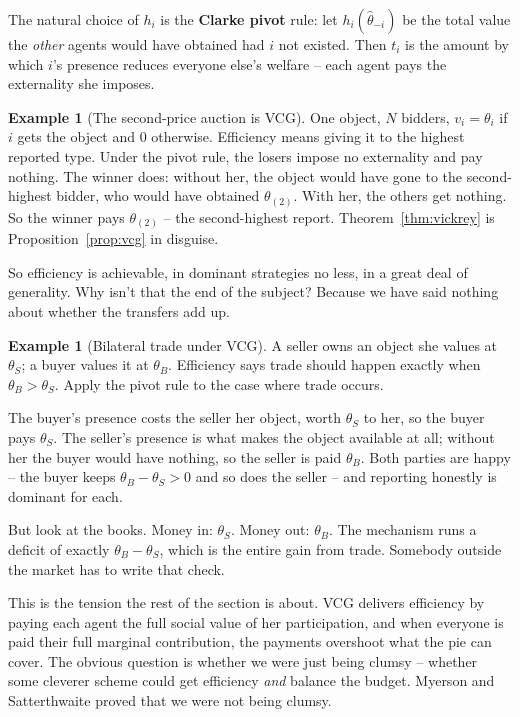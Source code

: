 \documentclass[12pt]{article}
\theoremstyle{definition}
\newtheorem{example}[theorem]{Example}
\theoremstyle{remark}
\theoremstyle{plain}                          %
\begin{document}
\noindent The natural choice of $h_i$ is the \textbf{Clarke pivot} rule: let $h_i(\hat\theta_{-i})$ be the total value the \emph{other} agents would have obtained had $i$ not existed. Then $t_i$ is the amount by which $i$'s presence reduces everyone else's welfare -- each agent pays the externality she imposes.
 
\begin{example}[The second-price auction is VCG]
One object, $N$ bidders, $v_i = \theta_i$ if $i$ gets the object and $0$ otherwise. Efficiency means giving it to the highest reported type. Under the pivot rule, the losers impose no externality and pay nothing. The winner does: without her, the object would have gone to the second-highest bidder, who would have obtained $\theta_{(2)}$. With her, the others get nothing. So the winner pays $\theta_{(2)}$ -- the second-highest report. Theorem~\ref{thm:vickrey} is Proposition~\ref{prop:vcg} in disguise.
\end{example}
 
So efficiency is achievable, in dominant strategies no less, in a great deal of generality. Why isn't that the end of the subject? Because we have said nothing about whether the transfers add up.
 
\begin{example}[Bilateral trade under VCG]\label{ex:vcg-trade}
A seller owns an object she values at $\theta_S$; a buyer values it at $\theta_B$. Efficiency says trade should happen exactly when $\theta_B > \theta_S$. Apply the pivot rule to the case where trade occurs.
 
The buyer's presence costs the seller her object, worth $\theta_S$ to her, so the buyer pays $\theta_S$. The seller's presence is what makes the object available at all; without her the buyer would have nothing, so the seller is paid $\theta_B$. Both parties are happy -- the buyer keeps $\theta_B - \theta_S > 0$ and so does the seller -- and reporting honestly is dominant for each.
 
But look at the books. Money in: $\theta_S$. Money out: $\theta_B$. The mechanism runs a deficit of exactly $\theta_B - \theta_S$, which is the entire gain from trade. Somebody outside the market has to write that check.
\end{example}
 
This is the tension the rest of the section is about. VCG delivers efficiency by paying each agent the full social value of her participation, and when everyone is paid their full marginal contribution, the payments overshoot what the pie can cover. The obvious question is whether we were just being clumsy -- whether some cleverer scheme could get efficiency \emph{and} balance the budget. Myerson and Satterthwaite proved that we were not being clumsy.
 
\end{document}
